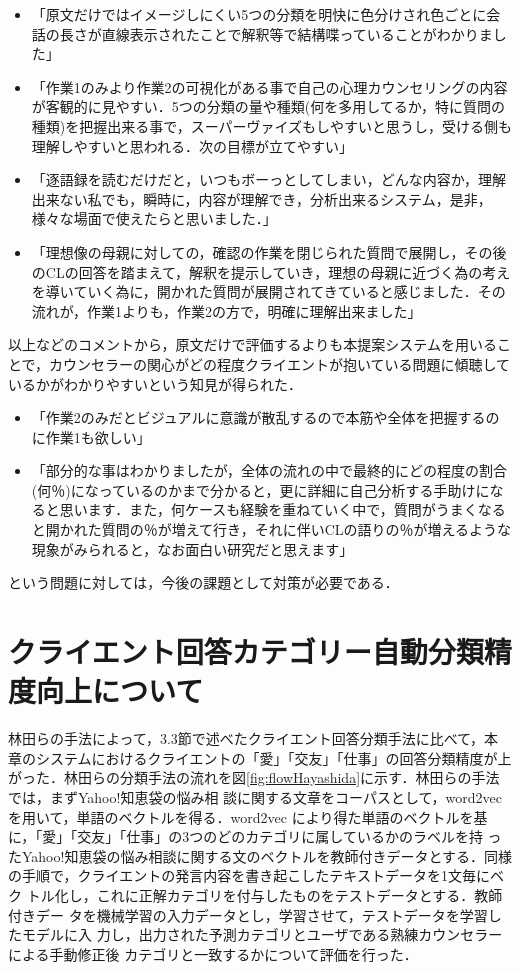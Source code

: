 \documentclass[shuuron]{kuee}
\begin{document}
%
\begin{itemize}
\item 「原文だけではイメージしにくい5つの分類を明快に色分けされ色ごとに会話の長さが直線表示されたことで解釈等で結構喋っていることがわかりました」
\item 「作業1のみより作業2の可視化がある事で自己の心理カウンセリングの内容が客観的に見やすい．5つの分類の量や種類(何を多用してるか，特に質問の種類)を把握出来る事で，スーパーヴァイズもしやすいと思うし，受ける側も理解しやすいと思われる．次の目標が立てやすい」
\item 「逐語録を読むだけだと，いつもボーっとしてしまい，どんな内容か，理解出来ない私でも，瞬時に，内容が理解でき，分析出来るシステム，是非，様々な場面で使えたらと思いました．」
\item 「理想像の母親に対しての，確認の作業を閉じられた質問で展開し，その後のCLの回答を踏まえて，解釈を提示していき，理想の母親に近づく為の考えを導いていく為に，開かれた質問が展開されてきていると感じました．その流れが，作業1よりも，作業2の方で，明確に理解出来ました」
\end{itemize}
以上などのコメントから，原文だけで評価するよりも本提案システムを用いることで，カウンセラーの関心がどの程度クライエントが抱いている問題に傾聴しているかがわかりやすいという知見が得られた．

\begin{itemize}
\item 「作業2のみだとビジュアルに意識が散乱するので本筋や全体を把握するのに作業1も欲しい」
\item 「部分的な事はわかりましたが，全体の流れの中で最終的にどの程度の割合(何％)になっているのかまで分かると，更に詳細に自己分析する手助けになると思います．また，何ケースも経験を重ねていく中で，質問がうまくなると開かれた質問の％が増えて行き，それに伴いCLの語りの％が増えるような現象がみられると，なお面白い研究だと思えます」
\end{itemize}
という問題に対しては，今後の課題として対策が必要である．


\section{クライエント回答カテゴリー自動分類精度向上について}%


林田ら\cite{hayashidaEn}の手法によって，3.3節で述べたクライエント回答分類手法に比べて，本章のシステムにおけるクライエントの「愛」「交友」「仕事」の回答分類精度が上がった．林田らの分類手法の流れを図\ref{fig:flowHayashida}に示す．林田らの手法では，まずYahoo!知恵袋の悩み相
談に関する文章をコーパスとして，word2vec\cite{mikolov2013efficient}を用いて，単語のベクトルを得る．word2vec
により得た単語のベクトルを基に，「愛」「交友」「仕事」の3つのどのカテゴリに属しているかのラベルを持
ったYahoo!知恵袋の悩み相談に関する文のベクトルを教師付きデータとする．同様
の手順で，クライエントの発言内容を書き起こしたテキストデータを1文毎にベク
トル化し，これに正解カテゴリを付与したものをテストデータとする．教師付きデー
タを機械学習の入力データとし，学習させて，テストデータを学習したモデルに入
力し，出力された予測カテゴリとユーザである熟練カウンセラーによる手動修正後
カテゴリと一致するかについて評価を行った．
\end{document}
